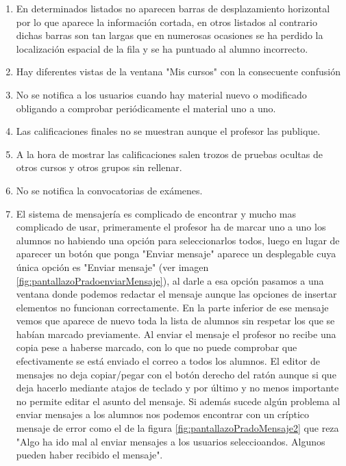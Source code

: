\begin{enumerate}
\item En determinados listados no aparecen barras de desplazamiento horizontal por lo que aparece la información cortada, en otros listados al contrario dichas barras son tan largas que en numerosas  ocasiones se ha perdido la localización espacial de la fila y se ha puntuado al alumno incorrecto.

\item Hay diferentes vistas de la ventana "Mis cursos" con la consecuente confusión

\item No se notifica a los usuarios cuando hay material nuevo o modificado obligando a comprobar periódicamente el material uno a uno.

\item Las calificaciones finales no se muestran aunque el profesor las publique.

\item A la hora de mostrar las calificaciones salen trozos de pruebas ocultas de otros cursos y otros grupos sin rellenar.

\item No se notifica la convocatorias de exámenes.

\item El sistema de mensajería es complicado de encontrar y mucho mas complicado de usar, primeramente el profesor ha de marcar uno a uno los alumnos no habiendo una opción para seleccionarlos todos, luego en lugar de aparecer un botón que ponga "Enviar mensaje" aparece un desplegable cuya única opción es "Enviar mensaje" (ver imagen \ref{fig:pantallazoPradoenviarMensaje}), al darle a esa opción pasamos a una ventana donde podemos redactar el mensaje aunque las opciones de insertar elementos no funcionan correctamente. En la parte inferior de ese mensaje vemos que aparece de nuevo toda la lista de alumnos sin respetar los que se habían marcado previamente. Al enviar el mensaje el profesor no recibe una copia pese a haberse marcado, con lo que no puede comprobar que efectivamente se está enviado el correo a todos los alumnos. El editor de mensajes no deja copiar/pegar con el botón derecho del ratón aunque si que deja hacerlo mediante atajos de teclado y por último y no menos importante no permite editar el asunto del mensaje. Si además sucede algún problema al enviar mensajes a los alumnos nos podemos encontrar con un críptico mensaje de error como el de la figura \ref{fig:pantallazoPradoMensaje2} que reza "Algo ha ido mal al enviar mensajes a los usuarios seleccioandos. Algunos pueden haber recibido el mensaje".



\end{enumerate}
